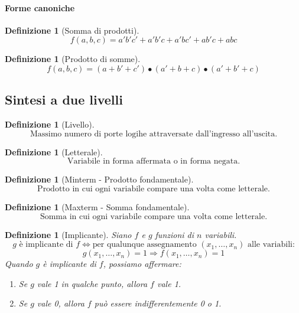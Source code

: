 \documentclass[a4paper,12pt]{article}
\theoremstyle{mystyle}
\newtheorem{definition}[theorem]{Definizione}
\begin{document}
\paragraph{Forme canoniche}

\begin{definition}[Somma di prodotti]
    \[
        f(a,b,c) = a'b'c' + a'b'c +a'bc' + ab'c + abc
    \]
\end{definition}

\begin{definition}[Prodotto di somme]
    \[
        f(a,b,c) = (a+b'+c') \bullet (a'+b+c) \bullet (a'+b'+c)
    \]
\end{definition}

\subsection{Sintesi a due livelli}
\begin{definition}[Livello]
    \[
        \text{Massimo numero di porte logihe attraversate dall'ingresso all'uscita.}
    \]
\end{definition}

\begin{definition}[Letterale]
    \[
        \text{Variabile in forma affermata o in forma negata.}
    \]
\end{definition}

\begin{definition}[Minterm - Prodotto fondamentale]
    \[
        \text{Prodotto in cui ogni variabile compare una volta come letterale.}
    \]  
\end{definition}

\begin{definition}[Maxterm - Somma fondamentale]
    \[
        \text{Somma in cui ogni variabile compare una volta come letterale.}
    \]
\end{definition}

\begin{definition}[Implicante]
    Siano \( f \) e \( g \) funzioni di \( n \) variabili.
    \[
        g \text{ è implicante di } f \Leftrightarrow \text{per qualunque assegnamento } (x_1, \ldots, x_n) \text{ alle variabili:}
    \]
    \[
        g(x_1, \ldots, x_n) = 1 \Rightarrow f(x_1, \ldots, x_n) = 1
    \]
    Quando \( g \) è implicante di \( f \), possiamo affermare:
    \begin{enumerate}[label=(\roman*)]
        \item Se \( g \) vale 1 in qualche punto, allora \( f \) vale 1.
        \item Se \( g \) vale 0, allora \( f \) può essere indifferentemente 0 o 1.
    \end{enumerate}
\end{definition}
\end{document}
